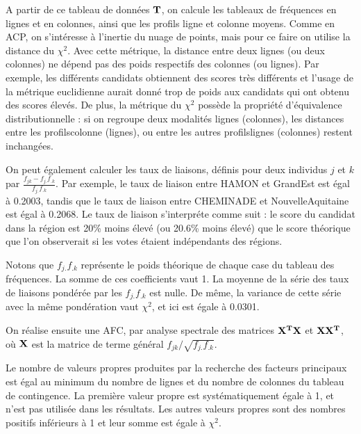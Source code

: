 \documentclass[letterpaper,10pt,french]{sphinxmanual}
\begin{document}
\sphinxAtStartPar
A partir de ce tableau de données \(\bf T\), on calcule les tableaux de fréquences en lignes et en colonnes, ainsi que les profils ligne et colonne moyens.
Comme en ACP, on s’intéresse à l’inertie du nuage de points, mais pour ce faire on utilise la distance du \(\chi^2\). Avec cette métrique, la distance entre deux lignes (ou deux colonnes) ne dépend pas des poids respectifs des colonnes (ou lignes). Par exemple, les différents candidats obtiennent des scores très différents et l’usage de la métrique euclidienne aurait donné trop de poids aux candidats qui ont obtenu des scores élevés. De plus, la métrique du \(\chi^2\) possède la propriété d’équivalence distributionnelle : si on regroupe deux modalités lignes (colonnes), les distances entre les profils\sphinxhyphen{}colonne (lignes), ou entre les autres profils\sphinxhyphen{}lignes (colonnes) restent inchangées.

\sphinxAtStartPar
{}

\sphinxAtStartPar
On peut également calculer les taux de liaisons, définis pour deux individus \(j\) et \(k\) par \(\frac{f_{jk}-f_{j.}f_{.k}}{f_{j.}f_{.k}}\). Par exemple, le taux de liaison entre HAMON et Grand\sphinxhyphen{}Est est égal à  \sphinxhyphen{}0.2003, tandis que le taux de liaison entre CHEMINADE et Nouvelle\sphinxhyphen{}Aquitaine est égal à 0.2068. Le taux de liaison s’interpréte comme suit : le score du candidat dans la région est 20\% moins élevé (ou 20.6\% moins élevé) que le score théorique que l’on observerait si les votes étaient indépendants des régions.

\sphinxAtStartPar
Notons que \(f_{j.}f_{.k}\) représente le poids théorique de chaque case du tableau des fréquences. La somme de ces coefficients vaut 1. La moyenne de la série des taux de liaisons pondérée par les \(f_{j.}f_{.k}\) est nulle. De même, la variance de cette série avec la même pondération vaut \(\chi^2\), et ici est égale à 0.0301.

\sphinxAtStartPar
On réalise ensuite une AFC, par analyse spectrale des matrices \(\bf X^T\bf X\) et \(\bf X\bf X^T\), où \(\bf X\) est la matrice de terme général \(f_{jk}/\sqrt{f_{j.}f_{.k}}\).

\sphinxAtStartPar
Le nombre de valeurs propres produites par la recherche des facteurs principaux est égal au minimum du nombre de lignes et du nombre de colonnes du tableau de contingence. La première valeur propre est systématiquement égale à 1, et n’est pas utilisée dans les résultats. Les autres valeurs propres sont des nombres positifs inférieurs à 1 et leur somme est égale à \(\chi^2\).
\end{document}
